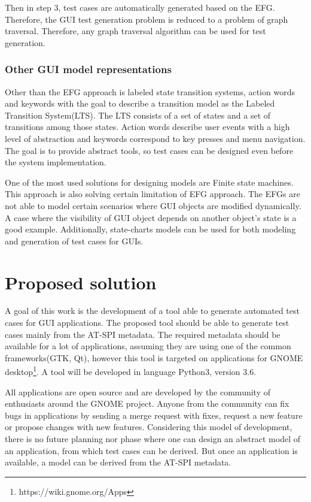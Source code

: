 Then in step 3, test cases are automatically generated based on the EFG. Therefore, the GUI test generation problem is reduced to a problem of graph traversal. Therefore, any graph traversal algorithm can be used for test generation. 

\subsection{Other GUI model representations}

Other than the EFG approach is labeled state transition systems, action words and keywords with the goal to describe a transition model as the Labeled Transition System(LTS). The LTS consists of a set of states and a set of transitions among those states. Action words describe user events with a high level of abstraction and keywords correspond to key presses and menu navigation. The goal is to provide abstract tools, so test cases can be designed even before the system implementation. 

One of the most used solutions for designing models are Finite state machines. This approach is also solving certain limitation of EFG approach. The EFGs are not able to model certain scenarios where GUI objects are modified dynamically. A case where the visibility of GUI object depends on another object's state is a good example. Additionally, state-charts models can be used for both modeling and generation of test cases for GUIs.\cite{patternbasedtesting}


\chapter{Proposed solution}
A goal of this work is the development of a tool able to generate automated test cases for GUI applications. The proposed tool should be able to generate test cases mainly from the AT-SPI metadata. The required metadata should be available for a lot of applications, assuming they are using one of the common frameworks(GTK, Qt), however this tool is targeted on applications for GNOME desktop\footnote{https://wiki.gnome.org/Apps}. A tool will be developed in language Python3, version 3.6.

All applications are open source and are developed by the community of enthusiasts around the GNOME project. Anyone from the community can fix bugs in applications by sending a merge request with fixes, request a new feature or propose changes with new features. Considering this model of development, there is no future planning nor phase where one can design an abstract model of an application, from which test cases can be derived. But once an application is available, a model can be derived from the AT-SPI metadata. 

